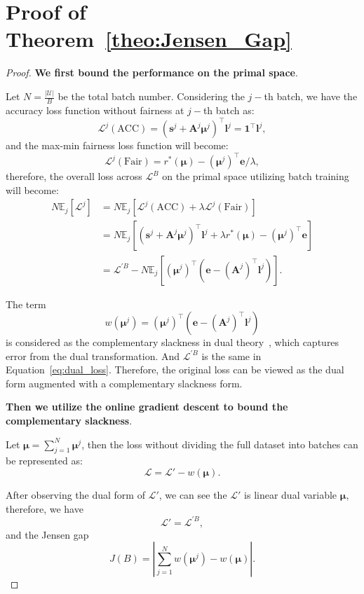 \section{Proof of Theorem~\ref{theo:Jensen_Gap}}\label{app:prof_Jensen_Gap}
\begin{proof}
    \textbf{We first bound the performance on the primal space}. 
    
    Let $N=\frac{|\mathcal{U}|}{B}$ be the total batch number.
    Considering the $j-$th batch, we have the accuracy loss function without fairness at $j-$th batch as:
    \[
        \mathcal{L}^j(\text{ACC}) = (\bm{s}^j + \bm{A}^j\bm{\mu}^j)^{\top}\bm{l}^j = \bm{1}^{\top}\bm{l}^j,
    \]
    and the max-min fairness loss function will become:
    \[
        \mathcal{L}^j(\text{Fair}) =  r^*(\bm{\mu}) - (\bm{\mu}^j)^{\top}\bm{e}/\lambda,
    \]
    therefore, the overall loss across $\mathcal{L}^B$ on the primal space utilizing batch training will become:
    \begin{align*}
        N\mathbb{E}_j[\mathcal{L}^j] &= N\mathbb{E}_j[\mathcal{L}^j(\text{ACC})+\lambda \mathcal{L}^j(\text{Fair})] \\
        &= N\mathbb{E}_j[(\bm{s}^j + \bm{A}^j\bm{\mu}^j)^{\top}\bm{l}^j + \lambda r^*(\bm{\mu}) - (\bm{\mu}^j)^{\top}\bm{e}]\\
        &= \mathcal{L}^{'B} - N\mathbb{E}_j[(\bm{\mu}^j)^{\top}(\bm{e}-(\bm{A}^j)^{\top}\bm{l}^j)].
    \end{align*}

    The term 
    \[
    w(\bm{\mu}^j)= (\bm{\mu}^j)^{\top}(\bm{e}-(\bm{A}^j)^{\top}\bm{l}^j)
    \]
    is considered as the complementary slackness in dual theory~\citep{churchman1957introduction}, which captures error from the dual transformation. And $\mathcal{L}^{'B}$ is the same in Equation~\eqref{eq:dual_loss}. Therefore, the original loss can be viewed as the dual form augmented with a complementary slackness form. 

    \textbf{Then we utilize the online gradient descent to bound the complementary slackness}.

    Let $\bm{\mu} = \sum_{j=1}^N \bm{\mu}^j$, then the loss without dividing the full dataset into batches can be represented as:
    \[
        \mathcal{L} = \mathcal{L}' - w(\bm{\mu}).
    \]

    After observing the dual form of $\mathcal{L}'$, we can see the $\mathcal{L}'$ is linear \wrt dual variable $\bm{\mu}$, therefore, we have
    \[
        \mathcal{L}' = \mathcal{L}^{'B},
    \]
    and the Jensen gap 
    \[
        J(B) = |\sum_{j=1}^Nw(\bm{\mu}^j)-w(\bm{\mu})|.
    \]


\end{proof}
